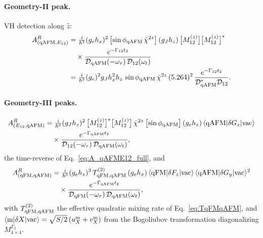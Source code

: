 \documentclass[reprint,amsmath,amssymb,aps,prb,longbibliography]{revtex4-2}
\begin{document}
\begin{widetext}
\paragraph{Geometry-II peak.} VH detection along $\hat z$:
\begin{equation}
\begin{aligned}
A_{(\mathrm{qAFM},E_{12})}^{R} &= \tfrac{i}{\hbar^3}(g_e h_x)^2\,
\bigl[\sin\phi_{\rm qAFM}\,\bar\chi^{2z}\bigr]\,(g_J h_z)\,
\bigl[M_{12}^{(z)}\bigr]\bigl[M_{12}^{(z)}\bigr]^*\\
&\quad\times \frac{e^{-\Gamma_{12}t_2}}{\mathcal D_{\rm qAFM}(-\omega_\tau)\,\mathcal D_{12}(\omega_t)}\\
&= \tfrac{i}{\hbar^3}(g_e)^2 g_J h_x^2 h_z\,
\sin\phi_{\rm qAFM}\,\bar\chi^{2z}\,(5.264)^2\,
\frac{e^{-\Gamma_{12}t_2}}{\mathcal D_{\rm qAFM}^*\mathcal D_{12}}.
\end{aligned}
\label{eq:A_qAFME12_full}
\end{equation}

\paragraph{Geometry-III peaks.}
\begin{equation}
\begin{aligned}
A_{(E_{12},\mathrm{qAFM})}^{R} &= \tfrac{i}{\hbar^3}(g_J h_z)^2\,
\bigl[M_{12}^{(z)}\bigr]^*\bigl[M_{12}^{(z)}\bigr]\,
\bar\chi^{2z}\,\bigl[\sin\phi_{\rm qAFM}\bigr]\,(g_e h_z)\,
\langle{\rm qAFM}|\delta G_z|{\rm vac}\rangle\\
&\quad\times \frac{e^{-\Gamma_{\rm qAFM}t_2}}{\mathcal D_{12}(-\omega_\tau)\,\mathcal D_{\rm qAFM}(\omega_t)},
\end{aligned}
\label{eq:A_E12qAFM_full}
\end{equation}
the time-reverse of Eq.~\eqref{eq:A_qAFME12_full}, and
\begin{equation}
\begin{aligned}
A_{(\mathrm{qFM},\mathrm{qAFM})}^{R} &= \tfrac{i}{\hbar^3}(g_e h_z)^3\,
T^{(2)}_{\rm qFM,qAFM}\,(g_e h_x)\,
\langle{\rm qFM}|\delta F_z|{\rm vac}\rangle\,\langle{\rm qAFM}|\delta G_y|{\rm vac}\rangle^2\\
&\quad\times \frac{e^{-\Gamma_{\rm qAFM}t_2}}{\mathcal D_{\rm qFM}(-\omega_\tau)\,\mathcal D_{\rm qAFM}(\omega_t)},
\end{aligned}
\label{eq:A_qFMqAFM_full}
\end{equation}
with $T^{(2)}_{\rm qFM,qAFM}$ the effective quadratic mixing rate of
Eq.~\eqref{eq:TqFMqAFM}, and $\langle{\rm m}|\delta X|{\rm vac}\rangle =
\sqrt{S/2}\,(u_X^{\rm m} + v_X^{\rm m})$ from the Bogoliubov transformation
diagonalizing $M^{\Gamma_2}_{4\times 4}$.
\end{widetext}
\end{document}
